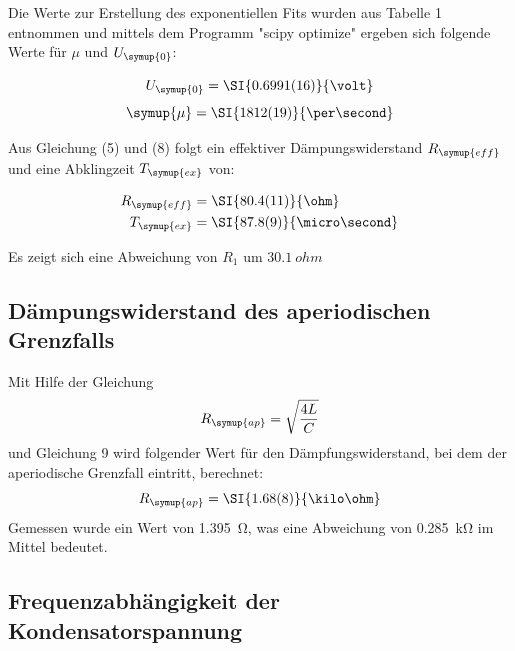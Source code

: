 Die Werte zur Erstellung des exponentiellen Fits wurden aus Tabelle 1 entnommen und mittels dem Programm
"scipy optimize" ergeben sich folgende Werte für $\mu$ und $U_\symup{0}$:

\begin{equation}
  U_\symup{0} = \SI{0.6991(16)}{\volt}
\end{equation}
\begin{equation}
  \symup{\mu} = \SI{1812(19)}{\per\second}
\end{equation}

Aus Gleichung (5) und (8) folgt ein effektiver Dämpungswiderstand $R_\symup{eff}$ und eine Abklingzeit $T_\symup{ex}$ von:

\begin{align*}
  R_\symup{eff} &= \SI{80.4(11)}{\ohm} \\
  T_\symup{ex} &= \SI{87.8(9)}{\micro\second}
\end{align*}


Es zeigt sich eine Abweichung von $R_1$ um $\SI{30.1}{ohm}$

\subsection{Dämpungswiderstand des aperiodischen Grenzfalls}

Mit Hilfe der Gleichung
\begin{equation*}
  R_\symup{ap} = \sqrt{\frac{4L}{C}}
\end{equation*} und Gleichung 9
wird folgender Wert für den Dämpfungswiderstand, bei dem der
aperiodische Grenzfall eintritt, berechnet:
\begin{equation*}
  R_\symup{ap} = \SI{1.68(8)}{\kilo\ohm}
\end{equation*}
Gemessen wurde ein Wert von \SI{1.395}{\ohm}, was eine Abweichung von \SI{0.285}{\kilo\ohm} im Mittel bedeutet.


\subsection{Frequenzabhängigkeit der Kondensatorspannung}


